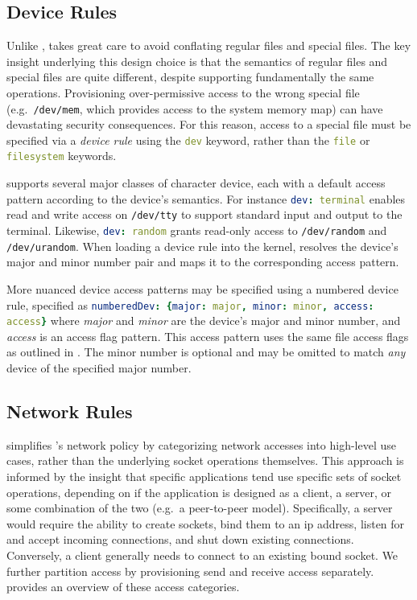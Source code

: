 \subsection{Device Rules}

Unlike \bpfbox{}, \bpfcontain{} takes great care to avoid conflating regular files and
special files. The key insight underlying this design choice is that the semantics of
regular files and special files are quite different, despite supporting fundamentally the
same operations. Provisioning over-permissive access to the wrong special file
(e.g.~\texttt{/dev/mem}, which provides access to the system memory map) can have
devastating security consequences. For this reason, access to a special file must be
specified via a \textit{device rule} using the \lstinline[language=yaml]|dev| keyword,
rather than the \lstinline[language=yaml]|file| or \lstinline[language=yaml]|filesystem|
keywords.

\bpfcontain{} supports several major classes of character device, each with a default
access pattern according to the device's semantics.  For instance
\lstinline[language=yaml]|dev: terminal| enables read and write access on
\texttt{/dev/tty} to support standard input and output to the terminal. Likewise,
\lstinline[language=yaml]|dev: random| grants read-only access to \texttt{/dev/random} and
\texttt{/dev/urandom}. When loading a device rule into the kernel, \bpfcontain{} resolves
the device's major and minor number pair and maps it to the corresponding access pattern.

More nuanced device access patterns may be specified using a numbered device rule,
specified as \lstinline[language=yaml]|numberedDev: {major: major, minor: minor, access: access}|
where \textit{major} and \textit{minor} are the device's major and minor number, and
\textit{access} is an access flag pattern. This access pattern uses the same file access
flags as outlined in . The minor number is optional and
may be omitted to match \textit{any} device of the specified major number.

\subsection{Network Rules}

\bpfcontain{} simplifies \bpfbox{}'s network policy by categorizing network accesses into
high-level use cases, rather than the underlying socket operations themselves. This
approach is informed by the insight that specific applications tend use specific sets of
socket operations, depending on if the application is designed as a client, a server, or
some combination of the two (e.g.~a peer-to-peer model). Specifically, a server would
require the ability to create sockets, bind them to an \gls{ip} address, listen for and
accept incoming connections, and shut down existing connections. Conversely, a client
generally needs to connect to an existing bound socket. We further partition access by
provisioning send and receive access separately.  provides an
overview of these access categories.

